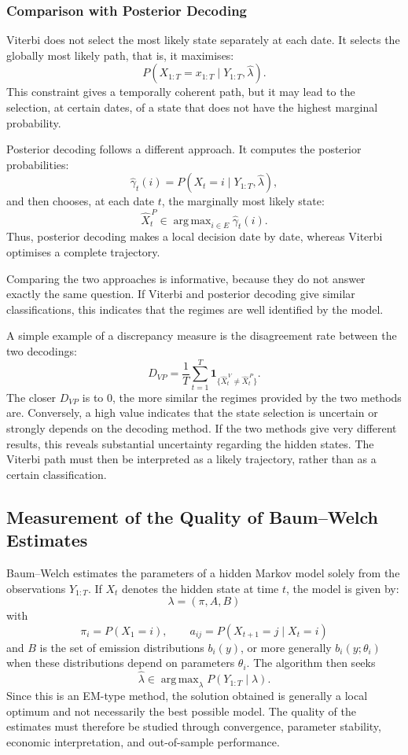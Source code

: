 \documentclass[11pt]{article}
\begin{document}
\subsubsection{Comparison with Posterior Decoding}

Viterbi does not select the most likely state separately at each date. It selects the globally most likely path, that is, it maximises:
\[
P(X_{1:T}=x_{1:T}\mid Y_{1:T},\widehat{\lambda}).
\]
This constraint gives a temporally coherent path, but it may lead to the selection, at certain dates, of a state that does not have the highest marginal probability.

Posterior decoding follows a different approach. It computes the posterior probabilities:
\[
\widehat{\gamma}_t(i)
=
P(X_t=i\mid Y_{1:T},\widehat{\lambda}),
\]
and then chooses, at each date \(t\), the marginally most likely state:
\[
\widehat{X}_t^{\,P}
\in
\mathop{\mathrm{arg\,max}}_{i\in E}
\widehat{\gamma}_t(i).
\]
Thus, posterior decoding makes a local decision date by date, whereas Viterbi optimises a complete trajectory.

Comparing the two approaches is informative, because they do not answer exactly the same question. If Viterbi and posterior decoding give similar classifications, this indicates that the regimes are well identified by the model.

A simple example of a discrepancy measure is the disagreement rate between the two decodings:
\[
D_{VP}
=
\frac{1}{T}
\sum_{t=1}^{T}
\mathbf{1}_{\{\widehat{X}_t^{\,V}\neq \widehat{X}_t^{\,P}\}}.
\]
The closer \(D_{VP}\) is to \(0\), the more similar the regimes provided by the two methods are. Conversely, a high value indicates that the state selection is uncertain or strongly depends on the decoding method. If the two methods give very different results, this reveals substantial uncertainty regarding the hidden states. The Viterbi path must then be interpreted as a likely trajectory, rather than as a certain classification.

\subsection{Measurement of the Quality of Baum--Welch Estimates}

Baum--Welch estimates the parameters of a hidden Markov model solely from the observations \(Y_{1:T}\). If \(X_t\) denotes the hidden state at time \(t\), the model is given by:
\[
\lambda=(\pi,A,B)
\]
with
\[
\pi_i=P(X_1=i),\qquad
a_{ij}=P(X_{t+1}=j\mid X_t=i)
\]
and \(B\) is the set of emission distributions \(b_i(y)\), or more generally \(b_i(y;\theta_i)\) when these distributions depend on parameters \(\theta_i\). The algorithm then seeks
\[
\widehat{\lambda}\in\mathop{\mathrm{arg\,max}}_{\lambda}P(Y_{1:T}\mid \lambda).
\]
Since this is an EM-type method, the solution obtained is generally a local optimum and not necessarily the best possible model. The quality of the estimates must therefore be studied through convergence, parameter stability, economic interpretation, and out-of-sample performance.
\end{document}
